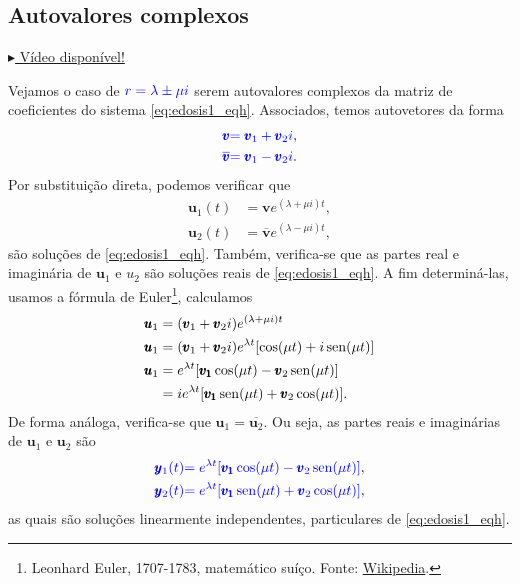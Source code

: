 \subsection{Autovalores complexos}

\begin{flushright}
  \href{https://archive.org/details/sistema-edos-autovalores-complexos}{$\blacktriangleright$ Vídeo disponível!}
\end{flushright}

Vejamos o caso de ${\color{blue}r=\lambda  \pm \mu i}$ serem autovalores complexos da matriz de coeficientes do sistema \eqref{eq:edosis1_eqh}. Associados, temos autovetores da forma
\begin{align}
  {\color{blue}\pmb{v}} &{\color{blue}= \pmb{v}_1 + \pmb{v}_2i},\\
  {\color{blue}\overline{\pmb{v}}} &{\color{blue}= \pmb{v}_1 - \pmb{v}_2i}.
\end{align}
Por substituição direta, podemos verificar que
\begin{align}
  \pmb{u}_1(t) &= \pmb{v}e^{(\lambda + \mu i)t},\\
  \pmb{u}_2(t) &= \overline{\pmb{v}}e^{(\lambda - \mu i)t},
\end{align}
são soluções de \eqref{eq:edosis1_eqh}. Também, verifica-se que as partes real e imaginária de $\pmb{u}_1$ e ${u}_2$ são soluções reais de \eqref{eq:edosis1_eqh}. A fim determiná-las, usamos a fórmula de Euler\footnote{Leonhard Euler, 1707-1783, matemático suíço. Fonte: \href{https://en.wikipedia.org/wiki/Leonhard_Euler}{Wikipedia}.}, calculamos
\begin{align}
  \pmb{u}_1 &= (\pmb{v}_1 + \pmb{v}_2i)e^{(\lambda + \mu i)t} \\
  \pmb{u}_1 &= (\pmb{v}_1 + \pmb{v}_2i)e^{\lambda t}[\cos(\mu t) + i\operatorname{sen}(\mu t)] \\
  \pmb{u}_1 &= e^{\lambda t}[\pmb{v_1}\cos(\mu t)-\pmb{v}_2\operatorname{sen}(\mu t)] \\
  &= ie^{\lambda t}[\pmb{v_1}\operatorname{sen}(\mu t) + \pmb{v}_2\cos(\mu t)].
\end{align}
De forma análoga, verifica-se que $\pmb{u}_1 = \overline{\pmb{u}_2}$. Ou seja, as partes reais e imaginárias de $\pmb{u}_1$ e $\pmb{u}_2$ são
\begin{align}
  {\color{blue}\pmb{y}_1(t)} &{\color{blue}= e^{\lambda t}[\pmb{v_1}\cos(\mu t)-\pmb{v}_2\operatorname{sen}(\mu t)]}, \\
  {\color{blue}\pmb{y}_2(t)} &{\color{blue}= e^{\lambda t}[\pmb{v_1}\operatorname{sen}(\mu t)+\pmb{v}_2\cos(\mu t)]},
\end{align}
as quais são soluções linearmente independentes, particulares de \eqref{eq:edosis1_eqh}.

